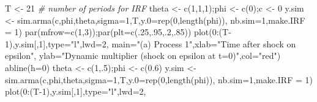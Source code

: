 \documentclass[
  12pt,
]{book}
\newenvironment{Shaded}{\begin{snugshade}}{\end{snugshade}}
\newcommand{\AttributeTok}[1]{\textcolor[rgb]{0.77,0.63,0.00}{#1}}
\newcommand{\CommentTok}[1]{\textcolor[rgb]{0.56,0.35,0.01}{\textit{#1}}}
\newcommand{\DecValTok}[1]{\textcolor[rgb]{0.00,0.00,0.81}{#1}}
\newcommand{\FloatTok}[1]{\textcolor[rgb]{0.00,0.00,0.81}{#1}}
\newcommand{\FunctionTok}[1]{\textcolor[rgb]{0.00,0.00,0.00}{#1}}
\newcommand{\NormalTok}[1]{#1}
\newcommand{\OtherTok}[1]{\textcolor[rgb]{0.56,0.35,0.01}{#1}}
\newcommand{\SpecialCharTok}[1]{\textcolor[rgb]{0.00,0.00,0.00}{#1}}
\newcommand{\StringTok}[1]{\textcolor[rgb]{0.31,0.60,0.02}{#1}}
\theoremstyle{definition}
\theoremstyle{definition}
\theoremstyle{definition}
\theoremstyle{definition}
\theoremstyle{remark}
\begin{document}
\begin{Shaded}
\begin{Highlighting}[]
\NormalTok{T }\OtherTok{\textless{}{-}} \DecValTok{21} \CommentTok{\# number of periods for IRF}
\NormalTok{theta }\OtherTok{\textless{}{-}} \FunctionTok{c}\NormalTok{(}\DecValTok{1}\NormalTok{,}\DecValTok{1}\NormalTok{,}\DecValTok{1}\NormalTok{);phi }\OtherTok{\textless{}{-}} \FunctionTok{c}\NormalTok{(}\DecValTok{0}\NormalTok{);c }\OtherTok{\textless{}{-}} \DecValTok{0}
\NormalTok{y.sim }\OtherTok{\textless{}{-}} \FunctionTok{sim.arma}\NormalTok{(c,phi,theta,}\AttributeTok{sigma=}\DecValTok{1}\NormalTok{,T,}\AttributeTok{y.0=}\FunctionTok{rep}\NormalTok{(}\DecValTok{0}\NormalTok{,}\FunctionTok{length}\NormalTok{(phi)),}
                  \AttributeTok{nb.sim=}\DecValTok{1}\NormalTok{,}\AttributeTok{make.IRF =} \DecValTok{1}\NormalTok{)}
\FunctionTok{par}\NormalTok{(}\AttributeTok{mfrow=}\FunctionTok{c}\NormalTok{(}\DecValTok{1}\NormalTok{,}\DecValTok{3}\NormalTok{));}\FunctionTok{par}\NormalTok{(}\AttributeTok{plt=}\FunctionTok{c}\NormalTok{(.}\DecValTok{25}\NormalTok{,.}\DecValTok{95}\NormalTok{,.}\DecValTok{2}\NormalTok{,.}\DecValTok{85}\NormalTok{))}
\FunctionTok{plot}\NormalTok{(}\DecValTok{0}\SpecialCharTok{:}\NormalTok{(T}\DecValTok{{-}1}\NormalTok{),y.sim[,}\DecValTok{1}\NormalTok{],}\AttributeTok{type=}\StringTok{"l"}\NormalTok{,}\AttributeTok{lwd=}\DecValTok{2}\NormalTok{,}
     \AttributeTok{main=}\StringTok{"(a) Process 1"}\NormalTok{,}\AttributeTok{xlab=}\StringTok{"Time after shock on epsilon"}\NormalTok{,}
     \AttributeTok{ylab=}\StringTok{"Dynamic multiplier (shock on epsilon at t=0)"}\NormalTok{,}\AttributeTok{col=}\StringTok{"red"}\NormalTok{)}
\FunctionTok{abline}\NormalTok{(}\AttributeTok{h=}\DecValTok{0}\NormalTok{)}
\NormalTok{theta }\OtherTok{\textless{}{-}} \FunctionTok{c}\NormalTok{(}\DecValTok{1}\NormalTok{,.}\DecValTok{5}\NormalTok{);phi }\OtherTok{\textless{}{-}} \FunctionTok{c}\NormalTok{(}\FloatTok{0.6}\NormalTok{)}
\NormalTok{y.sim }\OtherTok{\textless{}{-}} \FunctionTok{sim.arma}\NormalTok{(c,phi,theta,}\AttributeTok{sigma=}\DecValTok{1}\NormalTok{,T,}\AttributeTok{y.0=}\FunctionTok{rep}\NormalTok{(}\DecValTok{0}\NormalTok{,}\FunctionTok{length}\NormalTok{(phi)),}
                  \AttributeTok{nb.sim=}\DecValTok{1}\NormalTok{,}\AttributeTok{make.IRF =} \DecValTok{1}\NormalTok{)}
\FunctionTok{plot}\NormalTok{(}\DecValTok{0}\SpecialCharTok{:}\NormalTok{(T}\DecValTok{{-}1}\NormalTok{),y.sim[,}\DecValTok{1}\NormalTok{],}\AttributeTok{type=}\StringTok{"l"}\NormalTok{,}\AttributeTok{lwd=}\DecValTok{2}\NormalTok{,}

\end{Highlighting}
\end{Shaded}
\end{document}
